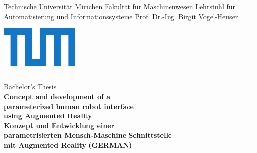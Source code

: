 \begin{titlepage}
	\begin{center}
%
%	
	\begin{minipage}[c]{9cm}
		\small
		Technische Universität München\newline
		Fakultät für Maschinenwesen\newline
		Lehrstuhl für Automatisierung und Informationssysteme\newline
		Prof. Dr.-Ing. Birgit Vogel-Heuser
	\end{minipage}
	\begin{minipage}[c]{6cm}
		\centering \includegraphics[height=2.0cm]{Figures/TUM_Logo_cmyk.pdf}
	\end{minipage}
%
%
%		
%		

	\rule{0.95\textwidth}{0.3mm}
	
	\vspace{1.0cm}
		
	\LARGE
	Bachelor's Thesis
	\\[1cm]
	\huge
	\textbf{Concept and development of a\\parameterized human robot interface\\using Augmented Reality}\\
	\vspace{0.8cm}
	\huge
	\textbf{Konzept und Entwicklung einer\\parametrisierten Mensch-Maschine Schnittstelle\\mit Augmented Reality (GERMAN)}
	\end{center}
	

\end{titlepage}

